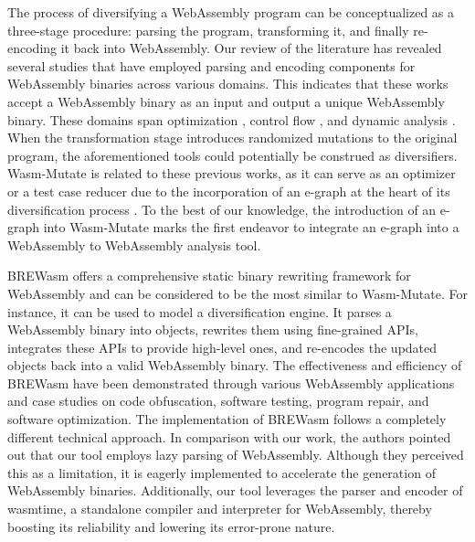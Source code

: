 \documentclass[a4paper,fleqn]{cas-dc}
\newcommand*\badge[1]{ \colorbox{red}{\color{white}#1}}
\newcommand{\tool}{{\sc Wasm-Mutate}\xspace}
\newcommand{\Wasm}{WebAssembly\xspace}
\newcommand{\wasm}{\Wasm}
\newcommand{\todo}[1]{%
\refstepcounter{todo}
\noindent\textbf{\badge{TODO}} {\color{red}#1}
\addcontentsline{td}{todo}
{\color{red}\thesection.\thetodo\xspace #1}}
\begin{document}
The process of diversifying a \Wasm program can be conceptualized as a three-stage procedure: parsing the program, transforming it, and finally re-encoding it back into \wasm. 
Our review of the literature has revealed several studies that have employed parsing and encoding components for \wasm binaries across various domains. 
This indicates that these works accept a \wasm binary as an input and output a unique \wasm binary. 
These domains span optimization \cite{wasmslim}, control flow \cite{10123627}, and dynamic analysis \cite{wasabi, stievenart2020compositional, 10123627, BRITO2022102745}.
When the transformation stage introduces randomized mutations to the original program, the aforementioned tools could potentially be construed as diversifiers.
\tool is related to these previous works, as it can serve as an optimizer or a test case reducer due to the incorporation of an e-graph at the heart of its diversification process \cite{10.1145/1480881.1480915}. 
To the best of our knowledge, the introduction of an e-graph into \tool marks the first endeavor to integrate an e-graph into a \wasm to \wasm analysis tool.




BREWasm \cite{rewritingtool2023} offers a comprehensive static binary rewriting framework for \Wasm and can be considered to be the most similar to \tool. 
For instance, it can be used to model a diversification engine.
It parses a WebAssembly binary into objects, rewrites them using fine-grained APIs, integrates these APIs to provide high-level ones, and re-encodes the updated objects back into a valid WebAssembly binary. 
The effectiveness and efficiency of BREWasm have been demonstrated through various WebAssembly applications and case studies on code obfuscation, software testing, program repair, and software optimization. 
The implementation of BREWasm follows a completely different technical approach.
In comparison with our work, the authors pointed out that our tool employs lazy parsing of WebAssembly. 
Although they perceived this as a limitation, it is eagerly implemented to accelerate the generation of \wasm binaries.
Additionally, our tool leverages the parser and encoder of wasmtime, a standalone compiler and interpreter for WebAssembly, thereby boosting its reliability and lowering its error-prone nature.
\end{document}
